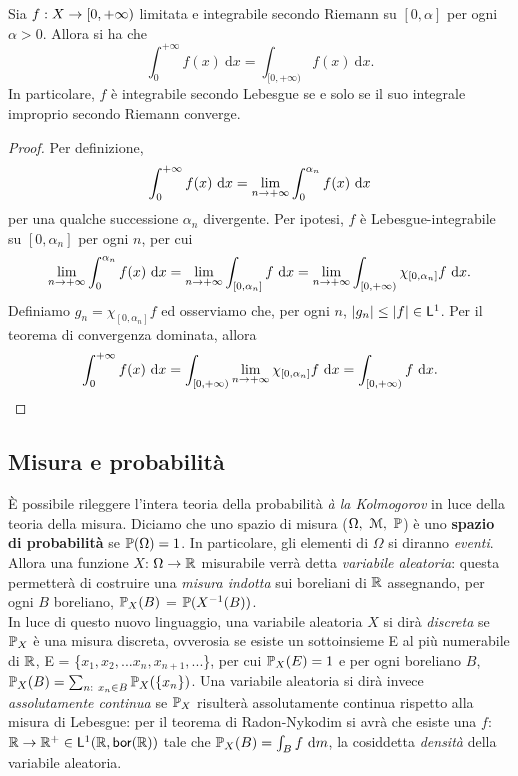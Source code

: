 \documentclass[Completo.tex]{subfiles}
\begin{document}
	\begin{Th}
		Sia $f: X \rightarrow [0, +\infty)$ limitata e integrabile secondo Riemann su $[0, \alpha]$ per ogni $\alpha > 0$. Allora si ha che
		\begin{equation*}
		\int_{0}^{+\infty} f(x) \ \mathrm{d}x = \int_{[0, +\infty)} f(x) \ \mathrm{d}x.
		\end{equation*}
		In particolare, $f$ è integrabile secondo Lebesgue se e solo se il suo integrale improprio secondo Riemann converge.
	\end{Th}
	\begin{proof}
		Per definizione,
		\begin{equation*}
		\int_{0}^{+\infty} f(x) \ \mathrm{d}x = \lim_{n \rightarrow +\infty} \int_{0}^{\alpha_n} f(x) \ \mathrm{d}x
		\end{equation*}
		per una qualche successione $\alpha_n$ divergente. Per ipotesi, $f$ è Lebesgue-integrabile su $[0, \alpha_n]$ per ogni $n$, per cui
		\begin{equation*}
		\lim_{n \rightarrow +\infty} \int_{0}^{\alpha_n} f(x) \ \mathrm{d}x = \lim_{n \rightarrow +\infty} \int_{[0, \alpha_n]} f \ \mathrm{d}x = \lim_{n \rightarrow +\infty} \int_{[0, +\infty)} \chi_{[0, \alpha_n]} f \ \mathrm{d}x.
		\end{equation*}
		Definiamo $g_n = \chi_{[0, \alpha_n]}f$ ed osserviamo che, per ogni $n$, $\vert g_n \vert \leq \vert f \vert \in \sf[L]^1$. Per il teorema di convergenza dominata, allora
		\begin{equation*}
		\int_{0}^{+\infty} f(x) \ \mathrm{d}x = \int_{[0,+\infty)} \lim_{n \ra +\infty}\chi_{[0, \alpha_n]}f \ \mathrm{d}x = \int_{[0, +\infty)} f \ \mathrm{d}x.
		\end{equation*}
	\end{proof}
	\subsection{Misura e probabilità}
	È possibile rileggere l'intera teoria della probabilità \textit{à la Kolmogorov} in luce della teoria della misura. Diciamo che uno spazio di misura ($\Omega, \ \eu[M], \ \bb[P]$) è uno \textbf{spazio di probabilità} se $\bb[P](\Omega) = 1$. In particolare, gli elementi di $\Omega$ si diranno \textit{eventi}. Allora una funzione $X$: $\Omega \ra \bb[R]$ misurabile verrà detta \textit{variabile aleatoria}: questa permetterà di costruire una \textit{misura indotta} sui boreliani di $\bb[R]$ assegnando, per ogni $B$ boreliano, $\bb[P]_X(B)$ = $\bb[P](X^{-1}(B))$. \\
	In luce di questo nuovo linguaggio, una variabile aleatoria $X$ si dirà \textit{discreta} se $\bb[P]_X$ è una misura discreta, ovverosia se esiste un sottoinsieme E al più numerabile di $\bb[R]$, E = \{$x_1, x_2, ... x_{n}, x_{n+1}, ...$\}, per cui $\bb[P]_X(E) = 1$ e per ogni boreliano $B$, $\bb[P]_X(B) = \sum_{n: \ x_n \in B} \bb[P]_X(\{x_n\})$. Una variabile aleatoria si dirà invece \textit{assolutamente continua} se $\bb[P]_X$ risulterà assolutamente continua rispetto alla misura di Lebesgue: per il teorema di Radon-Nykodim si avrà che esiste una $f$: $\bb[R] \ra \bb[R]^{+} \in \sf[L]^1(\bb[R], \sf[bor](\bb[R]))$ tale che $\bb[P]_X(B) = \int_B f \ \mathrm{d}m$, la cosiddetta \textit{densità} della variabile aleatoria.
\end{document}

